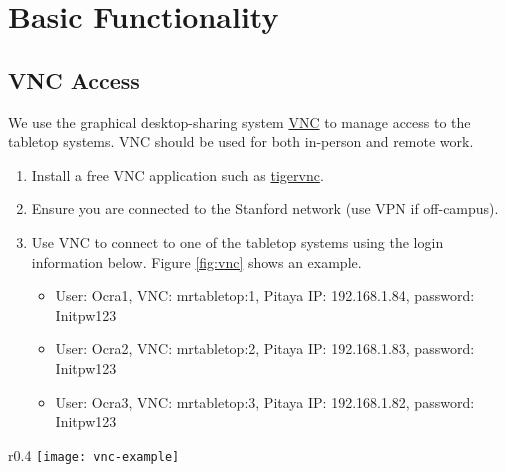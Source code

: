 \newpage
\section{Basic Functionality}

\subsection{VNC Access} \label{sec:vnc}

We use the graphical desktop-sharing system \href{https://en.wikipedia.org/wiki/Virtual_Network_Computing}{VNC} to manage access to the tabletop systems. VNC should be used for both in-person and remote work.

\begin{enumerate}
    \item   Install a free VNC application such as \href{https://tigervnc.org/}{tigervnc}.
    \item   Ensure you are connected to the Stanford network (use VPN if off-campus).
    \item   \label{step:login} Use VNC to connect to one of the tabletop systems using the login information below. Figure \ref{fig:vnc} shows an example.
    \begin{itemize}
        \item   User: Ocra1, VNC: mrtabletop:1, Pitaya IP: 192.168.1.84, password: Initpw123
        \item   User: Ocra2, VNC: mrtabletop:2, Pitaya IP: 192.168.1.83, password: Initpw123
        \item   User: Ocra3, VNC: mrtabletop:3, Pitaya IP: 192.168.1.82, password: Initpw123
    \end{itemize}
\end{enumerate}

\begin{wrapfigure}{r}{0.4\textwidth}
    \centering
    \texttt{[image: vnc-example]}
    \captionsetup{width=.36\textwidth}
    \caption{\label{fig:vnc}Example of a VNC connection interface.}
\end{wrapfigure}

